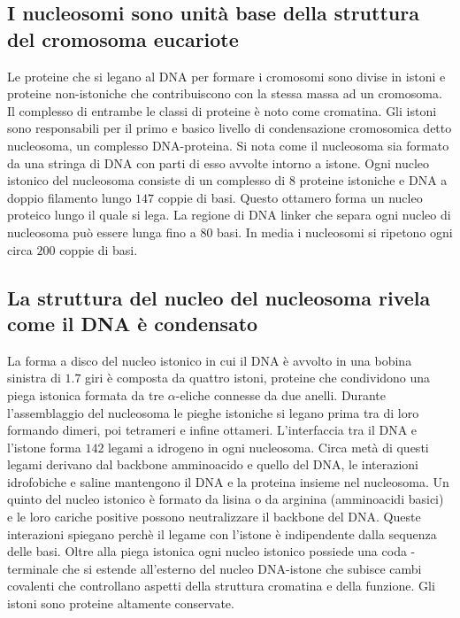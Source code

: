 \subsection{I nucleosomi sono unit\`a base della struttura del cromosoma eucariote}
Le proteine che si legano al DNA per formare i cromosomi sono divise in istoni e proteine non-istoniche che contribuiscono con la stessa massa ad un cromosoma. Il complesso di entrambe 
le classi di proteine \`e noto come cromatina. Gli istoni sono responsabili per il primo e basico livello di condensazione cromosomica detto nucleosoma, un complesso DNA-proteina. Si nota
come il nucleosoma sia formato da una stringa di DNA con parti di esso avvolte intorno a istone. Ogni nucleo istonico del nucleosoma consiste di un complesso di $8$ proteine istoniche
e DNA a doppio filamento lungo $147$ coppie di basi. Questo ottamero forma un nucleo proteico lungo il quale si lega. La regione di DNA linker che separa ogni nucleo di nucleosoma
pu\`o essere lunga fino a $80$ basi. In media i nucleosomi si ripetono ogni circa $200$ coppie di basi. 
\subsection{La struttura del nucleo del nucleosoma rivela come il DNA \`e condensato}
La forma a disco del nucleo istonico in cui il DNA \`e avvolto in una bobina sinistra di $1.7$ giri \`e composta da quattro istoni, proteine che condividono una piega istonica formata da
tre $\alpha$-eliche connesse da due anelli. Durante l'assemblaggio del nucleosoma le pieghe istoniche si legano prima tra di loro formando dimeri, poi tetrameri e infine ottameri. 
L'interfaccia tra il DNA e l'istone forma $142$ legami a idrogeno in ogni nucleosoma. Circa met\`a di questi legami derivano dal backbone amminoacido e quello del DNA, le interazioni
idrofobiche e saline mantengono il DNA e la proteina insieme nel nucleosoma. Un quinto del nucleo istonico \`e formato da lisina o da arginina (amminoacidi basici) e le loro cariche 
positive possono neutralizzare il backbone del DNA. Queste interazioni spiegano perch\`e il legame con l'istone \`e indipendente dalla sequenza delle basi. Oltre alla piega istonica
ogni nucleo istonico possiede una coda -terminale che si estende all'esterno del nucleo DNA-istone che subisce cambi covalenti che controllano aspetti della struttura cromatina
e della funzione. Gli istoni sono proteine altamente conservate. 

